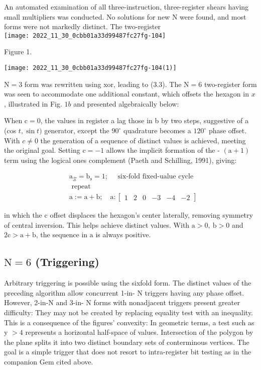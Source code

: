 \begin{CJK}{UTF8}{gbsn}
An automated examination of all three-instruction, three-register shears having small multipliers was conducted. No solutions for new $\mathrm{N}$ were found, and most forms were not markedly distinct. The two-register\\
\texttt{[image: 2022\_11\_30\_0cbb01a33d99487fc27fg-104]}

Figure 1.

\begin{center}
\texttt{[image: 2022\_11\_30\_0cbb01a33d99487fc27fg-104(1)]}
\end{center}

$\mathrm{N}=3$ form was rewritten using xor, leading to (3.3). The $\mathrm{N}=6$ two-register form was seen to accommodate one additional constant, which offsets the hexagon in $x$, illustrated in Fig. $1 b$ and presented algebraically below:

When $\mathrm{c}=0$, the values in register a lag those in b by two steps, suggestive of a (cos $t, \sin t)$ generator, except the $90^{\circ}$ quadrature becomes a $120^{\circ}$ phase offset. With $c \neq 0$ the generation of a sequence of distinct values is achieved, meeting the original goal. Setting $\mathrm{c}=-1$ allows the implicit formation of the - $(\mathrm{a}+1)$ term using the logical ones complement (Paeth and Schilling, 1991), giving:

$$
\begin{aligned}
& \mathrm{a}_{\bar{\Xi}}=\mathrm{b}_{\mathrm{s}}=1 ; \quad \text { six-fold fixed-ualue cycle } \\
& \text { repeat } \\
& \mathrm{a}:=\mathrm{a}+\mathrm{b} ; \quad \mathrm{a}:\left[\begin{array}{llllll}1 & 2 & 0 & -3 & -4 & -2\end{array}\right]
\end{aligned}
$$

in which the c offset displaces the hexagon's center laterally, removing symmetry of central inversion. This helps achieve distinct values. With $\mathrm{a}>0, \mathrm{~b}>0$ and $2 \mathrm{c}>\mathrm{a}+\mathrm{b}$, the sequence in $\mathrm{a}$ is always positive.

\subsection*{$\mathrm{N}=6$ (Triggering)}
Arbitrary triggering is possible using the sixfold form. The distinct values of the preceding algorithm allow concurrent 1-in- $\mathrm{N}$ triggers having any phase offset. However, 2-in-N and 3-in- $\mathrm{N}$ forms with nonadjacent triggers present greater difficulty: They may not be created by replacing equality test with an inequality. This is a consequence of the figures' convexity: In geometric terms, a test such as y $>4$ represents a horizontal half-space of values. Intersection of the polygon by the plane splits it into two distinct boundary sets of conterminous vertices. The goal is a simple trigger that does not resort to intra-register bit testing as in the companion Gem cited above.


\end{CJK}
